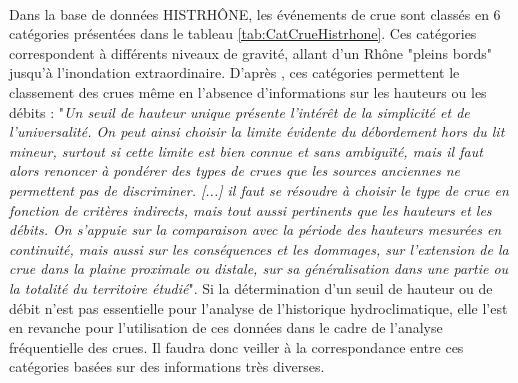 	\paragraph{} Dans la base de données HISTRHÔNE, les événements de crue sont classés en 6 catégories présentées dans le tableau \ref{tab:CatCrueHistrhone}. Ces catégories correspondent à différents niveaux de gravité, allant d'un Rhône "pleins bords" jusqu'à l'inondation extraordinaire. D'après \citet{pichard_sept_2014}, ces catégories permettent le classement des crues même en l'absence d'informations sur les hauteurs ou les débits : "\textit{Un seuil de hauteur unique présente l'intérêt de la simplicité et de l'universalité. On peut ainsi choisir la limite évidente du débordement hors du lit mineur, surtout si cette limite est bien connue et sans ambiguïté, mais il faut alors renoncer à pondérer des types de crues que les sources anciennes ne permettent pas de discriminer. [...] il faut se résoudre à choisir le type de crue en fonction de critères indirects, mais tout aussi pertinents que les hauteurs et les débits. On s'appuie sur la comparaison avec la période des hauteurs mesurées en continuité, mais aussi sur les conséquences et les dommages, sur l'extension de la crue dans la plaine proximale ou distale, sur sa généralisation dans une partie ou la totalité du territoire étudié}". Si la détermination d'un seuil de hauteur ou de débit n'est pas essentielle pour l'analyse de l'historique hydroclimatique, elle l'est en revanche pour l'utilisation de ces données dans le cadre de l'analyse fréquentielle des crues.  Il faudra donc veiller à la correspondance entre ces catégories basées sur des informations très diverses.
	
